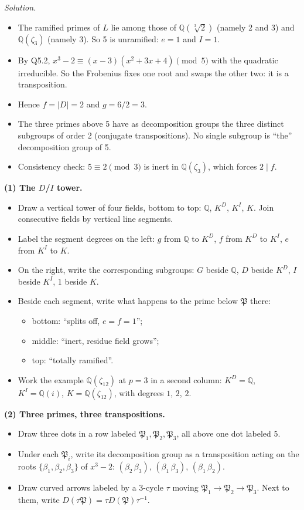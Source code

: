 \documentclass[11pt]{article}
\newcommand{\Q}{\mathbb{Q}}
\newcommand{\fP}{\mathfrak{P}}
\begin{document}
\begin{enumerate}[label=\textbf{Q7.\arabic*}]
  \textit{Solution.}
  \begin{itemize}
    \item The ramified primes of $L$ lie among those of $\Q(\sqrt[3]2)$ (namely 2 and 3) and $\Q(\zeta_3)$ (namely 3). So 5 is unramified: $e=1$ and $I=1$.
    \item By Q5.2, $x^3-2\equiv(x-3)(x^2+3x+4)\pmod 5$ with the quadratic irreducible. So the Frobenius fixes one root and swaps the other two: it is a transposition.
    \item Hence $f=|D|=2$ and $g=6/2=3$.
    \item The three primes above 5 have as decomposition groups the three distinct subgroups of order 2 (conjugate transpositions). No single subgroup is ``the'' decomposition group of 5.
    \item Consistency check: $5\equiv2\pmod3$ is inert in $\Q(\zeta_3)$, which forces $2\mid f$.
  \end{itemize}
\end{enumerate}

\begin{instructornote}
\textbf{(1) The $D$/$I$ tower.}
\begin{itemize}
  \item Draw a vertical tower of four fields, bottom to top: $\Q$, $K^D$, $K^I$, $K$. Join consecutive fields by vertical line segments.
  \item Label the segment degrees on the left: $g$ from $\Q$ to $K^D$, $f$ from $K^D$ to $K^I$, $e$ from $K^I$ to $K$.
  \item On the right, write the corresponding subgroups: $G$ beside $\Q$, $D$ beside $K^D$, $I$ beside $K^I$, $1$ beside $K$.
  \item Beside each segment, write what happens to the prime below $\fP$ there:
  \begin{itemize}
    \item bottom: ``splits off, $e=f=1$'';
    \item middle: ``inert, residue field grows'';
    \item top: ``totally ramified''.
  \end{itemize}
  \item Work the example $\Q(\zeta_{12})$ at $p=3$ in a second column: $K^D=\Q$, $K^I=\Q(i)$, $K=\Q(\zeta_{12})$, with degrees $1$, $2$, $2$.
\end{itemize}

\textbf{(2) Three primes, three transpositions.}
\begin{itemize}
  \item Draw three dots in a row labeled $\fP_1,\fP_2,\fP_3$, all above one dot labeled $5$.
  \item Under each $\fP_i$, write its decomposition group as a transposition acting on the roots $\{\beta_1,\beta_2,\beta_3\}$ of $x^3-2$: $(\beta_2\,\beta_3)$, $(\beta_1\,\beta_3)$, $(\beta_1\,\beta_2)$.
  \item Draw curved arrows labeled by a 3-cycle $\tau$ moving $\fP_1\to\fP_2\to\fP_3$. Next to them, write $D(\tau\fP)=\tau D(\fP)\tau^{-1}$.
\end{itemize}
\end{instructornote}
\end{document}
